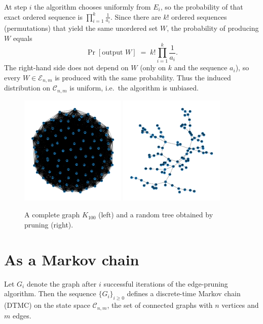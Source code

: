 \documentclass[11pt,a4paper]{article}
\begin{document}
At step \(i\) the algorithm chooses uniformly from \(E_i\), so the probability
of that exact ordered sequence is \(\prod_{i=1}^k \frac{1}{a_i}\). Since there
are \(k!\) ordered sequences (permutations) that yield the same unordered set
\(W\), the probability of producing \(W\) equals
\[
\Pr[\text{output } W] \;=\; k! \prod_{i=1}^k \frac{1}{a_i}.
\]
The right-hand side does not depend on \(W\) (only on \(k\) and the
sequence \(a_i\)), so every \(W\in\mathcal{E}_{n,m}\) is produced with the
same probability. Thus the induced distribution on \(\mathcal{C}_{n,m}\) is
uniform, i.e.\ the algorithm is unbiased.


\begin{figure}[h!]
\centering
\includegraphics[width=0.45\textwidth]{../Images/K100.png}
\includegraphics[width=0.45\textwidth]{../Images/TreeFromK100.png}
\caption{A complete graph $K_{100}$ (left) and a random tree obtained by pruning (right).}
\end{figure}

\section{As a Markov chain}

Let $G_i$ denote the graph after $i$ successful iterations of the edge-pruning algorithm. Then the sequence $\{G_i\}_{i\ge 0}$ defines a discrete-time Markov chain (DTMC) on the state space $\mathcal{C}_{n,m}$, the set of connected graphs with $n$ vertices and $m$ edges.  
\end{document}
